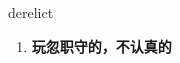 
\begin{frame}
{\huge derelict}
\begin{center}
\begin{enumerate}\Large
  \item \textbf{玩忽职守的，不认真的}
\end{enumerate}
\end{center}
\end{frame}
